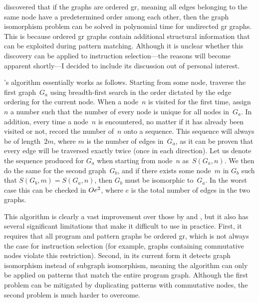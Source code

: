  discovered that if the
\glspl{graph} are \gls{ordered gr}, meaning all \glspl{edge} belonging to the
same node have a predetermined order among each other, then the \gls{graph
  isomorphism} problem can be solved in polynomial time for \gls{undirected gr}
\glspl{graph}.
%
This is because \gls{ordered gr} \glspl{graph} contain additional
structural information that can be exploited during \gls{pattern
  matching}.
%
Although it is unclear whether this discovery can be applied to
\gls{instruction selection}---the reasons will become apparent shortly---I
decided to include its discussion out of personal interest.

\citeauthor{Jiang1996}'s algorithm essentially works as follows.
%
Starting from
some \gls{node}, traverse the first \gls{graph}~$G_a$ using breadth-first search
in the order dictated by the \gls{edge} ordering for the current
\gls{node}.
%
When a \gls{node}~$n$ is visited for the first time, assign $n$ a
number such that the number of every \gls{node} is unique for all \glspl{node}
in~$G_a$.
%
In addition, every time a \gls{node}~$n$ is encountered, no matter if
it has already been visited or not, record the number of~$n$ onto a
sequence.
%
This sequence will always be of length~$2m$, where $m$ is the number
of \glspl{edge} in~$G_a$, as it can be proven that every \gls{edge} will be
traversed exactly twice (once in each direction).
%
Let us denote the sequence
produced for $G_a$ when starting from \gls{node}~$n$ as~\mbox{$S(G_a, n)$}.
%
We
then do the same for the second \gls{graph}~$G_b$, and if there exists some
\gls{node}~$m$ in $G_b$ such that \mbox{$S(G_b, m) = S(G_a, n)$}, then $G_b$
must be \gls{isomorphic} to~$G_a$.
%
In the worst case this can be checked in
$O{e^2}$, where $e$ is the total number of \glspl{edge} in the two
\glspl{graph}.

This algorithm is clearly a vast improvement over those by
\citeauthor{Ullmann1976} and \citeauthor{Cordella2001}, but it also has several
significant limitations that make it difficult to use in practice.
%
First, it
requires that all \gls{program} and \glspl{pattern graph} be \gls{ordered gr},
which is not always the case for \gls{instruction selection} (for example,
\glspl{graph} containing commutative \glspl{node} violate this
restriction).
%
Second, in its current form it detects \gls{graph isomorphism}
instead of \gls{subgraph isomorphism}, meaning the algorithm can only be applied
on \glspl{pattern} that match the entire \gls{program graph}.
%
Although the first
problem can be mitigated by duplicating \glspl{pattern} with commutative
\glspl{node}, the second problem is much harder to overcome.


